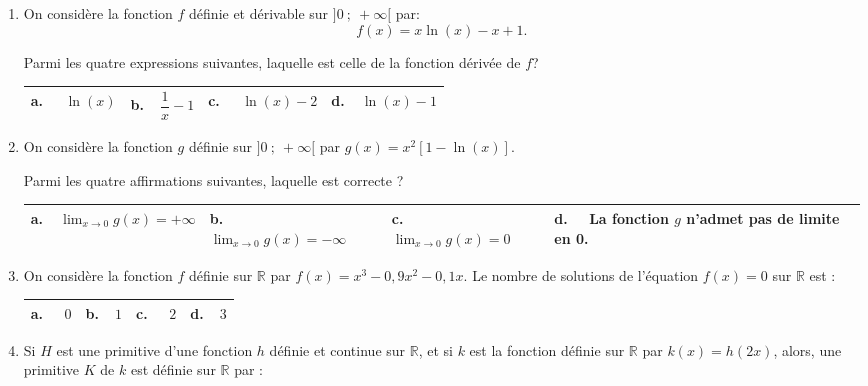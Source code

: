 \documentclass[10pt,a4paper]{article}
\newcommand{\R}{\mathbb{R}}
\begin{document}
\begin{enumerate}
\item On considère la fonction $f$ définie et dérivable sur $]0~;~+\infty[$ par:
\[f(x) = x \ln(x) - x + 1.\]

Parmi les quatre expressions suivantes, laquelle est celle de la fonction dérivée de $f$?

\begin{center}
\begin{tabularx}{\linewidth}{|*{4}{X|}}\hline
\textbf{a.~~} $\ln (x)$&\textbf{b.~~}$\dfrac{1}{x} - 1$&\textbf{c.~~} $\ln (x) - 2$&\textbf{d.~~}$\ln (x) - 1$\rule[-3mm]{0mm}{9mm}\\ \hline
\end{tabularx}
\end{center}

\item On considère la fonction $g$ définie sur $]0~;~+\infty[$ par $g(x) = x^2[1 - \ln (x)]$.

 Parmi les quatre affirmations suivantes, laquelle est correcte ?
 
\begin{center}
\begin{tabularx}{\linewidth}{|*{4}{X|}}\hline
\textbf{a.~~}$\displaystyle\lim_{x \to 0} g(x) = +\infty$&\textbf{b.~~} 
$\displaystyle\lim_{x \to 0} g(x) = - \infty$&\textbf{c.~~} $\displaystyle\lim_{x \to 0} g(x) = 0$&\textbf{d.~~} La fonction $g$ n'admet pas de limite en 0.\\ \hline
\end{tabularx}
\end{center}

\item On considère la fonction $f$ définie sur $\R$ par $f(x) = x^3 - 0,9x^2 -0,1x$. Le nombre de solutions de l'équation $f(x) = 0$ sur $\R$ est :

\begin{center}
\begin{tabularx}{\linewidth}{|*{4}{X|}}\hline
\textbf{a.~~} $0$&\textbf{b.~~}$1$&\textbf{c.~~} $2$&\textbf{d.~~}$3$\\ \hline
\end{tabularx}
\end{center}

\item Si $H$ est une primitive d'une fonction $h$ définie et continue sur $\R$, 
et si $k$ est la fonction définie sur $\R$ par $k(x) = h(2x)$, 
alors, une primitive $K$ de $k$ est définie sur $\R$ par :


\end{enumerate}
\end{document}
